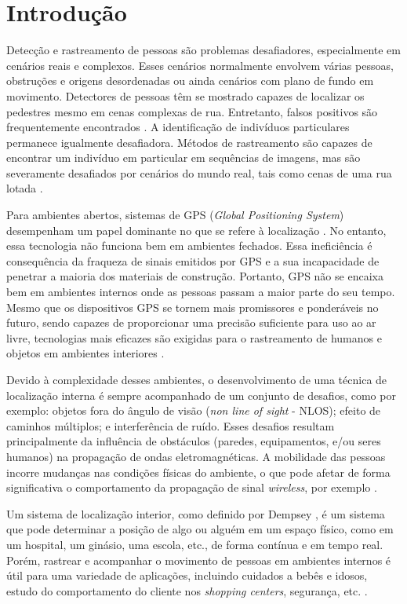\section{Introdução}\label{sec:introducao}

Detecção e rastreamento de pessoas são problemas desafiadores, especialmente em cenários reais e complexos. Esses cenários normalmente envolvem várias pessoas, obstruções e origens desordenadas ou ainda cenários com plano de fundo em movimento. Detectores de pessoas têm se mostrado capazes de localizar os pedestres mesmo em cenas complexas de rua. Entretanto, falsos positivos são frequentemente encontrados \cite{andriluka2008people}. A identificação de indivíduos particulares permanece igualmente desafiadora.
Métodos de rastreamento são capazes de encontrar um indivíduo em particular em sequências de imagens, mas são severamente desafiados por cenários do mundo real, tais como cenas de uma rua lotada \cite{andriluka2008people}.

Para ambientes abertos, sistemas de GPS (\textit{Global Positioning System}) desempenham um papel dominante no que se refere à localização \cite{fritsche2009}. No entanto, essa tecnologia não funciona bem em ambientes fechados. Essa ineficiência é consequência da fraqueza de sinais emitidos por GPS e a sua incapacidade de penetrar a maioria dos materiais de construção. Portanto, GPS não se encaixa bem em ambientes internos onde as pessoas passam a maior parte do seu tempo. Mesmo que os dispositivos GPS se tornem mais promissores e ponderáveis no futuro, sendo capazes de proporcionar uma precisão suficiente para uso ao ar livre, tecnologias mais eficazes são exigidas para o rastreamento de humanos e objetos em ambientes interiores \cite{zhang2010localization}.

Devido à complexidade desses ambientes, o desenvolvimento de uma técnica de localização interna é sempre acompanhado de um conjunto de desafios, como por exemplo: objetos fora do ângulo de visão (\textit{non line of sight} - NLOS); efeito de caminhos múltiplos; e interferência de ruído. Esses desafios resultam principalmente da influência de obstáculos (paredes, equipamentos, e/ou seres humanos) na propagação de ondas eletromagnéticas. A mobilidade das pessoas incorre mudanças nas condições físicas do ambiente, o que pode afetar de forma significativa o comportamento da propagação de sinal \textit{wireless}, por exemplo \cite{zhang2010localization}. 

Um sistema de localização interior, como definido por Dempsey \cite{dempsey2003indoor}, é um sistema que pode determinar a posição de algo ou alguém em um espaço físico, como em um hospital, um ginásio, uma escola, etc., de forma contínua e em tempo real. Porém, rastrear e acompanhar o movimento de pessoas em ambientes internos é útil para uma variedade de aplicações, incluindo cuidados a bebês e idosos, estudo do comportamento do cliente nos \textit{shopping centers}, segurança, etc. \cite{yiu2007tracking}.

